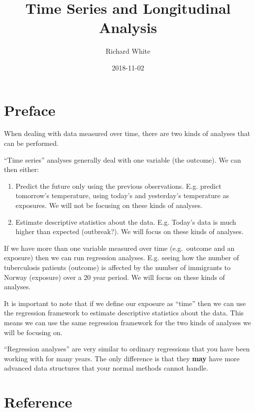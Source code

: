 \documentclass[]{book}
\title{Time Series and Longitudinal Analysis}
\author{Richard White}
\date{2018-11-02}
\providecommand{\tightlist}{%
  \setlength{\itemsep}{0pt}\setlength{\parskip}{0pt}}
\begin{document}
\maketitle

{
\setcounter{tocdepth}{1}
\tableofcontents
}
\chapter*{Preface}\label{preface}

When dealing with data measured over time, there are two kinds of
analyses that can be performed.

``Time series'' analyses generally deal with one variable (the outcome).
We can then either:

\begin{enumerate}
\def\labelenumi{\arabic{enumi}.}
\tightlist
\item
  Predict the future only using the previous observations. E.g. predict
  tomorrow's temperature, using today's and yesterday's temperature as
  exposures. We will not be focusing on these kinds of analyses.
\item
  Estimate descriptive statistics about the data. E.g. Today's data is
  much higher than expected (outbreak?). We will focus on these kinds of
  analyses.
\end{enumerate}

If we have more than one variable measured over time (e.g.~outcome and
an exposure) then we can run regression analyses. E.g. seeing how the
number of tuberculosis patients (outcome) is affected by the number of
immigrants to Norway (exposure) over a 20 year period. We will focus on
these kinds of analyses.

It is important to note that if we define our exposure as ``time'' then
we can use the regression framework to estimate descriptive statistics
about the data. This means we can use the same regression framework for
the two kinds of analyses we will be focusing on.

``Regression analyses'' are very similar to ordinary regressions that
you have been working with for many years. The only difference is that
they \textbf{may} have more advanced data structures that your normal
methods cannot handle.

\chapter{Reference}\label{reference}
\end{document}

